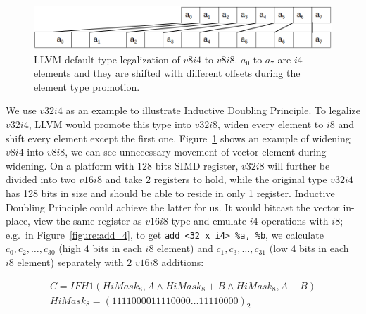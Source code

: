\begin{figure}[ht!]
\centering
\includegraphics[width=130mm]{draw/v8i4_v8i8.png}
\caption[LLVM default type legalization of $v8i4$ to $v8i8$.]{LLVM default type legalization of $v8i4$ to $v8i8$. $a_0$ to $a_7$ are $i4$ elements and they are shifted with different offsets during the element type promotion.}
\label{figure:v8i4_v8i8}
\end{figure}

We use $v32i4$ as an example to illustrate Inductive Doubling Principle. To legalize $v32i4$, LLVM would promote this type into $v32i8$, widen every element to $i8$ and shift every element except the first one. Figure~\ref{figure:v8i4_v8i8} shows an example of widening $v8i4$ into $v8i8$, we can see unnecessary movement of vector element during widening. On a platform with 128 bits SIMD register, $v32i8$ will further be divided into two $v16i8$ and take 2 registers to hold, while the original type $v32i4$ has 128 bits in size and should be able to reside in only 1 register. Inductive Doubling Principle could achieve the latter for us. It would bitcast the vector in-place, view the same register as $v16i8$ type and emulate $i4$ operations with $i8$; e.g.\ in Figure~\ref{figure:add_4}, to get \verb|add <32 x i4> %a, %b|, we calculate $c_0, c_2, \ldots, c_{30}$ (high 4 bits in each $i8$ element) and $c_1, c_3, \ldots, c_{31}$ (low 4 bits in each $i8$ element) separately with 2 $v16i8$ additions:

\begin{gather}
C = IFH1(HiMask_8, A \land HiMask_8 + B \land HiMask_8, A + B) \\
HiMask_8 = (1111000011110000 \ldots 11110000)_2
\end{gather}


